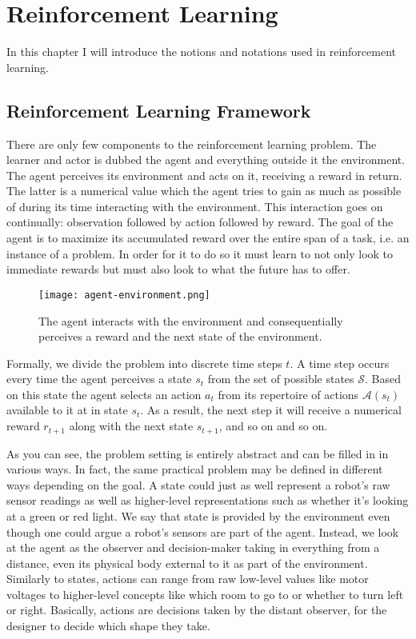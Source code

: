 \chapter{Reinforcement Learning}
In this chapter I will introduce the notions and notations
used in reinforcement learning.

\section{Reinforcement Learning Framework}
There are only few components to the reinforcement learning problem.
The learner and actor is dubbed the agent and everything outside it the environment.
The agent perceives its environment and acts on it,
receiving a reward in return.
The latter is a numerical value
which the agent tries to gain as much as possible of
during its time interacting with the environment.
This interaction goes on continually:
observation followed by action followed by reward.
The goal of the agent is to maximize its accumulated reward
over the entire span of a task,
i.e. an instance of a problem.
In order for it to do so
it must learn to not only look to immediate rewards
but must also look to what the future has to offer.

\begin{figure}[h]
	\center
	\texttt{[image: agent-environment.png]}
	\caption{The agent interacts with the environment and consequentially perceives a reward and the next state of the environment.}
	\label{agent-env}
\end{figure}

Formally, we divide the problem into discrete time steps $t$.
A time step occurs every time the agent perceives a state $s_t$
from the set of possible states $\mathcal{S}$.
Based on this state the agent selects an action $a_t$
from its repertoire of actions $\mathcal{A}(s_t)$
available to it at in state $s_t$.
As a result, the next step it will receive a numerical reward $r_{t+1}$
along with the next state $s_{t+1}$,
and so on and so on.

As you can see, the problem setting is entirely abstract
and can be filled in in various ways.
In fact, the same practical problem may be defined in different ways
depending on the goal.
A state could just as well represent a robot's raw sensor readings
as well as higher-level representations
such as whether it's looking at a green or red light.
We say that state is provided by the environment
even though one could argue a robot's sensors
are part of the agent.
Instead, we look at the agent as the observer and decision-maker
taking in everything from a distance,
even its physical body external to it
as part of the environment.
Similarly to states,
actions can range from raw low-level values
like motor voltages
to higher-level concepts like which room to go to
or whether to turn left or right.
Basically, actions are decisions taken by the distant observer,
for the designer to decide which shape they take.

